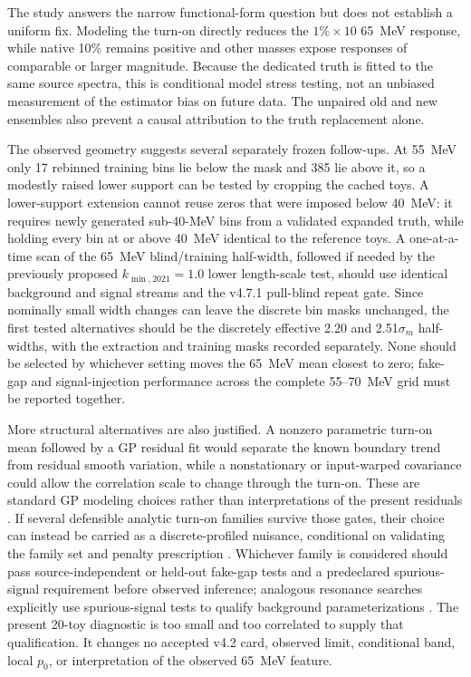 The study answers the narrow functional-form question but does not establish
a uniform fix.  Modeling the turn-on directly reduces the $1\%\times10$
65~MeV response, while native 10\% remains positive and other masses expose
responses of comparable or larger magnitude.  Because the dedicated truth is
fitted to the same source spectra, this is conditional model stress testing,
not an unbiased measurement of the estimator bias on future data.  The
unpaired old and new ensembles also prevent a causal attribution to the truth
replacement alone.

The observed geometry suggests several separately frozen follow-ups.  At
55~MeV only 17 rebinned training bins lie below the mask and 385 lie above it,
so a modestly raised lower support can be tested by cropping the cached toys.
A lower-support extension cannot reuse zeros that were imposed below 40~MeV:
it requires newly generated sub-40-MeV bins from a validated expanded truth,
while holding every bin at or above 40~MeV identical to the reference toys.
A one-at-a-time scan of the 65~MeV blind/training half-width, followed if
needed by the previously proposed $k_{\min,2021}=1.0$ lower length-scale test,
should use identical background and signal streams and the v4.7.1 pull-blind
repeat gate.  Since nominally small width changes can leave the discrete bin
masks unchanged, the first tested alternatives should be the discretely
effective 2.20 and 2.51$\sigma_m$ half-widths, with the extraction and training
masks recorded separately.  None should be selected by whichever setting
moves the 65~MeV mean closest to zero; fake-gap and signal-injection performance
across the complete 55--70~MeV grid must be reported together.

More structural alternatives are also justified.  A nonzero parametric
turn-on mean followed by a GP residual fit would separate the known boundary
trend from residual smooth variation, while a nonstationary or input-warped
covariance could allow the correlation scale to change through the turn-on.
These are standard GP modeling choices rather than interpretations of the
present residuals \cite{RasmussenWilliams2006,FrateGP2017,BarrLiu2025}.
If several defensible analytic turn-on families survive those gates, their
choice can instead be carried as a discrete-profiled nuisance, conditional on
validating the family set and penalty prescription
\cite{Dauncey2015DiscreteProfiling}.
Whichever family is considered should pass source-independent or held-out
fake-gap tests and a predeclared spurious-signal requirement before observed
inference; analogous resonance searches explicitly use spurious-signal tests
to qualify background parameterizations \cite{ATLASSpuriousSignal2024}.
The present 20-toy diagnostic is too small and too correlated to supply that
qualification.  It changes no accepted v4.2 card, observed limit, conditional
band, local $p_0$, or interpretation of the observed 65~MeV feature.

